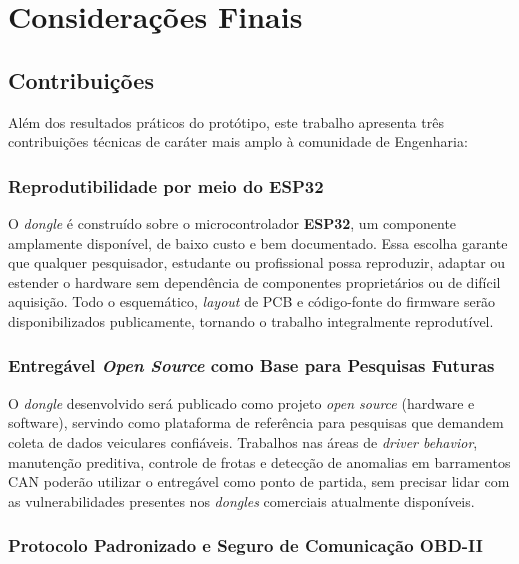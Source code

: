 \chapter{Considerações Finais} \label{cap:consideracoes}


\section{Contribuições}
Além dos resultados práticos do protótipo, este trabalho apresenta três contribuições
técnicas de caráter mais amplo à comunidade de Engenharia:
 
\subsection{Reprodutibilidade por meio do ESP32}
 
O \textit{dongle} é construído sobre o microcontrolador \textbf{ESP32}, um
componente amplamente disponível, de baixo custo e bem documentado. Essa escolha
garante que qualquer pesquisador, estudante ou profissional possa reproduzir,
adaptar ou estender o hardware sem dependência de componentes proprietários ou de
difícil aquisição. Todo o esquemático, \textit{layout} de PCB e código-fonte do
firmware serão disponibilizados publicamente, tornando o trabalho integralmente
reprodutível.
 
\subsection{Entregável \textit{Open Source} como Base para Pesquisas Futuras}
 
O \textit{dongle} desenvolvido será publicado como projeto \textit{open source}
(hardware e software), servindo como plataforma de referência para pesquisas que
demandem coleta de dados veiculares confiáveis. Trabalhos nas áreas de
\textit{driver behavior}, manutenção preditiva, controle de frotas e detecção de
anomalias em barramentos CAN poderão utilizar o entregável como ponto de partida,
sem precisar lidar com as vulnerabilidades presentes nos \textit{dongles} comerciais
atualmente disponíveis.
 
\subsection{Protocolo Padronizado e Seguro de Comunicação OBD-II}
 
